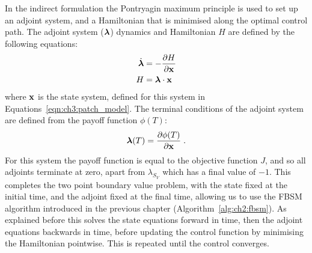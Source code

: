 In the indirect formulation the Pontryagin maximum principle is used to set up an adjoint system, and a Hamiltonian that is minimised along the optimal control path. The adjoint system ($\mathbf{\bm{\lambda}}$) dynamics and Hamiltonian $H$ are defined by the following equations:
\begin{subequations}\label{eqn:ch3:adjoint_hamiltonian}
    \begin{align}
        \dot{\mathbf{\bm{\lambda}}} &= -\frac{\partial{}H}{\partial\mathbf{\bm{x}}} \label{eqn:ch3:adjoint_hamiltonian_a}\\
        H &= \mathbf{\bm{\lambda}}\cdot\mathbf{\bm{x}} \label{eqn:ch3:adjoint_hamiltonian_b}
    \end{align}
\end{subequations}
where $\mathbf{\bm{x}}$ is the state system, defined for this system in Equations~\ref{eqn:ch3:patch_model}. The terminal conditions of the adjoint system are defined from the payoff function $\phi(T)$:
\begin{equation}
    \mathbf{\bm{\lambda}}(T) = \frac{\partial\phi(T)}{\partial\mathbf{\bm{x}}}\;.
\end{equation}
For this system the payoff function is equal to the objective function $J$, and so all adjoints terminate at zero, apart from $\lambda_{S_V}$ which has a final value of $-1$. This completes the two point boundary value problem, with the state fixed at the initial time, and the adjoint fixed at the final time, allowing us to use the FBSM algorithm introduced in the previous chapter (Algorithm~\ref{alg:ch2:fbsm}). As explained before this solves the state equations forward in time, then the adjoint equations backwards in time, before updating the control function by minimising the Hamiltonian pointwise. This is repeated until the control converges.

